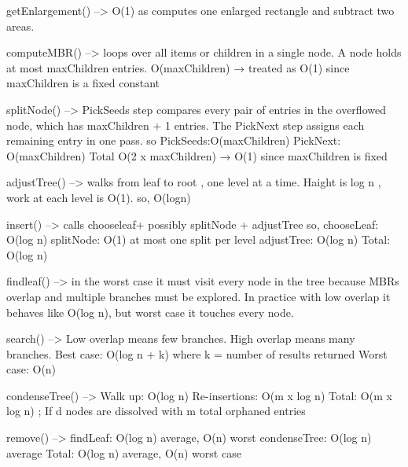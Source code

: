getEnlargement() --> O(1) as computes one enlarged rectangle and subtract two areas.

computeMBR() --> loops over all items or children in a single node. A node holds at most maxChildren entries.
        O(maxChildren)  →  treated as O(1) since maxChildren is a fixed constant

splitNode() --> PickSeeds step compares every pair of entries in the overflowed node, which has maxChildren + 1 entries. The PickNext step assigns each remaining entry in one pass.
                so PickSeeds:O(maxChildren)
                PickNext: O(maxChildren)
                Total O(2 x maxChildren) →  O(1) since maxChildren is fixed

adjustTree() --> walks from leaf to root , one level at a time. Haight is log n , work at each level is O(1).
                    so, O(logn)

insert() --> calls chooseleaf+ possibly splitNode + adjustTree
            so, chooseLeaf:   O(log n)
            splitNode:    O(1)  at most one split per level
            adjustTree:   O(log n)
            Total:        O(log n)

findleaf() --> in the worst case it must visit every node in the tree because MBRs overlap and multiple branches must be explored. 
                In practice with low overlap it behaves like O(log n), but worst case it touches every node.

search() --> Low overlap means few branches. High overlap means many branches.
            Best case:   O(log n + k)   where k = number of results returned
            Worst case:  O(n)

condenseTree() -->  Walk up:      O(log n)
                    Re-insertions: O(m x log n)
                    Total:        O(m x log n) ; If d nodes are dissolved with m total orphaned entries

remove() --> findLeaf:      O(log n) average, O(n) worst
            condenseTree:  O(log n) average
            Total:         O(log n) average,  O(n) worst case